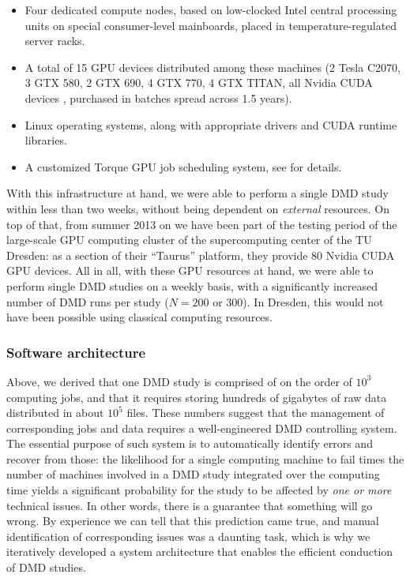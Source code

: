 \begin{itemize}
\item Four dedicated compute nodes, based on low-clocked Intel central
processing units on special consumer-level mainboards, placed in
temperature-regulated server racks.
\item A total of 15 GPU devices distributed among these machines (2 Tesla C2070,
3 GTX 580, 2 GTX 690, 4 GTX 770, 4 GTX TITAN, all Nvidia CUDA devices
\cite{nvidia_cuda_devices}, purchased in batches spread across 1.5 years).
\item Linux operating systems, along with appropriate drivers and CUDA runtime
libraries.
\item A customized Torque \cite{torque_website} GPU job scheduling system, see
\cite{gehrcke_torque_gpu_setup} for details.
\end{itemize}

With this infrastructure at hand, we were able to perform a single DMD study
within less than two weeks, without being dependent on \textit{external}
resources. On top of that, from summer 2013 on we have been part of the testing
period of the large-scale GPU computing cluster of the supercomputing center of
the TU Dresden: as a section of their \enquote{Taurus} platform, they provide 80
Nvidia CUDA GPU devices. All in all, with these GPU resources at hand, we were
able to perform single DMD studies on a weekly basis, with a significantly
increased number of DMD runs per study ($N=200$ or $300$). In Dresden, this
would not have been possible using classical computing resources.


\subsubsection{Software architecture}

Above, we derived that one DMD study is comprised of on the order of $10^3$
computing jobs, and that it requires storing hundreds of gigabytes of raw data
distributed in about $10^5$ files. These numbers suggest that the management of
corresponding jobs and data requires a well-engineered DMD controlling system.
The essential purpose of such system is to automatically identify errors and
recover from those: the likelihood for a single computing machine to fail times
the number of machines involved in a DMD study integrated over the computing
time yields a significant probability for the study to be affected by
\textit{one or more} technical issues. In other words, there is a guarantee
that something will go wrong. By experience we can tell that this prediction
came true, and manual identification of corresponding issues was a daunting
task, which is why we iteratively developed a system architecture that enables
the efficient conduction of DMD studies.

